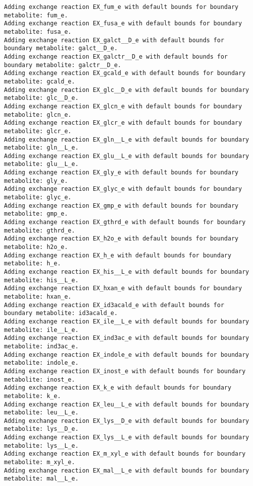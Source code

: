 \documentclass[
  letterpaper,
  DIV=11,
  numbers=noendperiod]{scrartcl}
\begin{document}
\begin{verbatim}
Adding exchange reaction EX_fum_e with default bounds for boundary metabolite: fum_e.
Adding exchange reaction EX_fusa_e with default bounds for boundary metabolite: fusa_e.
Adding exchange reaction EX_galct__D_e with default bounds for boundary metabolite: galct__D_e.
Adding exchange reaction EX_galctr__D_e with default bounds for boundary metabolite: galctr__D_e.
Adding exchange reaction EX_gcald_e with default bounds for boundary metabolite: gcald_e.
Adding exchange reaction EX_glc__D_e with default bounds for boundary metabolite: glc__D_e.
Adding exchange reaction EX_glcn_e with default bounds for boundary metabolite: glcn_e.
Adding exchange reaction EX_glcr_e with default bounds for boundary metabolite: glcr_e.
Adding exchange reaction EX_gln__L_e with default bounds for boundary metabolite: gln__L_e.
Adding exchange reaction EX_glu__L_e with default bounds for boundary metabolite: glu__L_e.
Adding exchange reaction EX_gly_e with default bounds for boundary metabolite: gly_e.
Adding exchange reaction EX_glyc_e with default bounds for boundary metabolite: glyc_e.
Adding exchange reaction EX_gmp_e with default bounds for boundary metabolite: gmp_e.
Adding exchange reaction EX_gthrd_e with default bounds for boundary metabolite: gthrd_e.
Adding exchange reaction EX_h2o_e with default bounds for boundary metabolite: h2o_e.
Adding exchange reaction EX_h_e with default bounds for boundary metabolite: h_e.
Adding exchange reaction EX_his__L_e with default bounds for boundary metabolite: his__L_e.
Adding exchange reaction EX_hxan_e with default bounds for boundary metabolite: hxan_e.
Adding exchange reaction EX_id3acald_e with default bounds for boundary metabolite: id3acald_e.
Adding exchange reaction EX_ile__L_e with default bounds for boundary metabolite: ile__L_e.
Adding exchange reaction EX_ind3ac_e with default bounds for boundary metabolite: ind3ac_e.
Adding exchange reaction EX_indole_e with default bounds for boundary metabolite: indole_e.
Adding exchange reaction EX_inost_e with default bounds for boundary metabolite: inost_e.
Adding exchange reaction EX_k_e with default bounds for boundary metabolite: k_e.
Adding exchange reaction EX_leu__L_e with default bounds for boundary metabolite: leu__L_e.
Adding exchange reaction EX_lys__D_e with default bounds for boundary metabolite: lys__D_e.
Adding exchange reaction EX_lys__L_e with default bounds for boundary metabolite: lys__L_e.
Adding exchange reaction EX_m_xyl_e with default bounds for boundary metabolite: m_xyl_e.
Adding exchange reaction EX_mal__L_e with default bounds for boundary metabolite: mal__L_e.

\end{verbatim}
\end{document}
